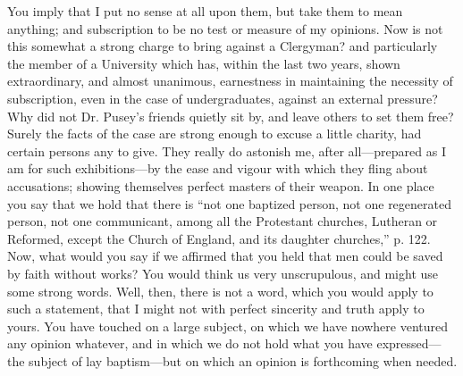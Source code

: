 You imply that I put no sense at all upon them,
but take them to mean anything; and subscription to be no test or
measure of my opinions. Now is not this somewhat a strong charge to
bring against a Clergyman? and particularly the member of a University
which has, within the last two years, shown extraordinary, and
almost unanimous, earnestness in maintaining the necessity of
subscription, even in the case of undergraduates, against an external
pressure? Why did not Dr. Pusey's friends quietly sit by, and leave
others to set them free? Surely the facts of the case are strong
enough to excuse a little charity, had certain persons any to give.
They really do astonish me, after all—prepared as I am for such
exhibitions—by the ease and vigour with which they fling about
accusations; showing themselves perfect masters of their weapon. In
one place you say that we hold that there is ``not one baptized person,
not one regenerated person, not one communicant, among all the
Protestant churches, Lutheran or Reformed, except the Church of
England, and its daughter churches,'' p. 122. Now, what would you say
if we affirmed that you held that men could be saved by faith without
works? You would think us very unscrupulous, and might use some strong
words. Well, then, there is not a word, which you would apply to such
a statement, that I might not with perfect sincerity and truth apply
to yours. You have touched on a large subject, on which we have
nowhere ventured any opinion whatever, and in which we do not hold
what you have expressed—the subject of lay baptism—but on which an
opinion is forthcoming when needed.

